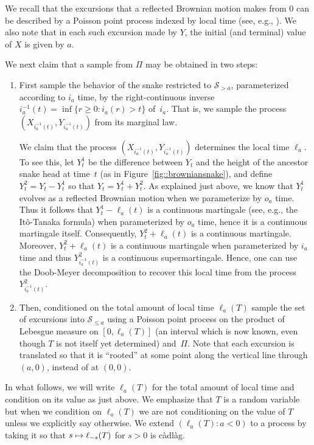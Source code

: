 \documentclass[JEP,XML,SOM,Unicode]{cedram}
\let\mathcal\mathscr
\newcommand\mto{\mathchoice{\longmapsto}{\mapsto}{\mapsto}{\mapsto}}
\theoremstyle{plain}
\numberwithin{theorem}{section}
\theoremstyle{definition}
\newcommand{\snake}{{\mathcal S}}
\newcommand{\cadlag}{càdlàg}
\let\snakeexcursionmeasure \Pi
\begin{document}
We recall that the excursions that a reflected Brownian motion makes from $0$ can be described by a Poisson point process indexed by local time (see, e.g., \cite[Chap.\,VI]{ry99martingales}). We also note that in each such excursion made by $Y$, the initial (and terminal) value of $X$ is given by $a$.

We next claim that a sample from $\snakeexcursionmeasure$ may be obtained in two steps:
\begin{enumerate}
\item First sample the behavior of the snake restricted to $\snake_{>a}$, parameterized according to $i_a$ time, \ie by the right-continuous inverse $i_a^{-1}(t) = \inf\{r\!\geq\!0 : i_a(r)\!>\!t\}$ of~$i_a$. That is, we sample the process $(X_{i_a^{-1}(t)}, Y_{i_a^{-1}(t)})$ from its marginal law.

We claim that the process $(X_{i_a^{-1}(t)},Y_{i_a^{-1}(t)})$ determines the local time $\ell_a$. To see this, let $Y^1_t$ be the difference between $Y_t$ and the height of the ancestor snake head at time~$t$ (as in Figure~\ref{fig::browniansnake}), and define $Y^2_t = Y_t - Y^1_t$ so that $Y_t = Y^1_t + Y^2_t$. As explained just above, we know that $Y_t^1$ evolves as a reflected Brownian motion when we parameterize by $o_a$ time. Thus it follows that $Y^1_t - \ell_a(t)$ is a continuous martingale (see, e.g., the Itô-Tanaka formula) when parameterized by $o_a$ time, hence it is a continuous martingale itself. Consequently, $Y^2_t + \ell_a(t)$ is a continuous martingale. Moreover, $Y_t^2 + \ell_a(t)$ is a continuous martingale when parameterized by $i_a$ time and thus $Y_{i_a^{-1}(t)}^2$ is a continuous supermartingale. Hence, one can use the Doob-Meyer decomposition to recover this local time from the process $Y_{i_a^{-1}(t)}^2$.
\item Then, conditioned on the total amount of local time $\ell_a(T)$ sample the set of excursions into $\snake_{\leq a}$ using a Poisson point process on the product of Lebesgue measure on $[0,\ell_a(T)]$ (an interval which is now known, even though $T$ is not itself yet determined) and~$\snakeexcursionmeasure$. Note that each excursion is translated so that it is ``rooted'' at some point along the vertical line through $(a,0)$, instead of at $(0,0)$.
\end{enumerate}

In what follows, we will write $\ell_a(T)$ for the total amount of local time and condition on its value as just above. We emphasize that $T$ is a random variable but when we condition on $\ell_a(T)$ we are not conditioning on the value of $T$ unless we explicitly say otherwise. We extend $(\ell_a(T) : a < 0)$ to a process by taking it so that $s \mto \ell_{-s}(T)$ for $s > 0$ is {\cadlag}.
\end{document}
